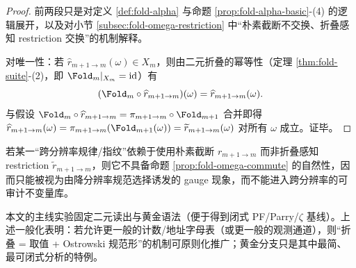 \begin{proof}
前两段只是对定义 \ref{def:fold-alpha} 与命题 \ref{prop:fold-alpha-basic}-(4) 的逻辑展开，以及对小节 \ref{subsec:fold-omega-restriction} 中“朴素截断不交换、折叠感知 restriction 交换”的机制解释。
\par
对唯一性：若 \(\widehat r_{m+1\to m}(\omega)\in X_m\)，则由二元折叠的幂等性（定理 \ref{thm:fold-suite}-(2)，即 \(\Fold_m|_{X_m}=\mathrm{id}\)）有
\[
(\Fold_m\circ \widehat r_{m+1\to m})(\omega)=\widehat r_{m+1\to m}(\omega).
\]
与假设 \(\Fold_m\circ \widehat r_{m+1\to m}=\pi_{m+1\to m}\circ \Fold_{m+1}\) 合并即得
\(
\widehat r_{m+1\to m}(\omega)=\pi_{m+1\to m}(\Fold_{m+1}(\omega))=\widetilde r_{m+1\to m}(\omega)
\)
对所有 \(\omega\) 成立。证毕。
\end{proof}

\begin{corollary}[跨分辨率可审计不变量的判据]\label{cor:multiscale-auditable-invariants}
若某一“跨分辨率规律/指纹”依赖于使用朴素截断 \(r_{m+1\to m}\) 而非折叠感知 restriction \(\widetilde r_{m+1\to m}\)，则它不具备命题 \ref{prop:fold-omega-commute} 的自然性，因而只能被视为由降分辨率规范选择诱发的 gauge 现象，而不能进入跨分辨率的可审计不变量库。
\end{corollary}

\begin{remark}[与本文二元读出的关系]
本文的主线实验固定二元读出与黄金语法（便于得到闭式 PF/Parry/$\zeta$ 基线）。上述一般化表明：若允许更一般的计数/地址字母表（或更一般的观测通道），则“折叠 = 取值 + Ostrowski 规范形”的机制可原则化推广；黄金分支只是其中最简、最可闭式分析的特例。
\end{remark}
